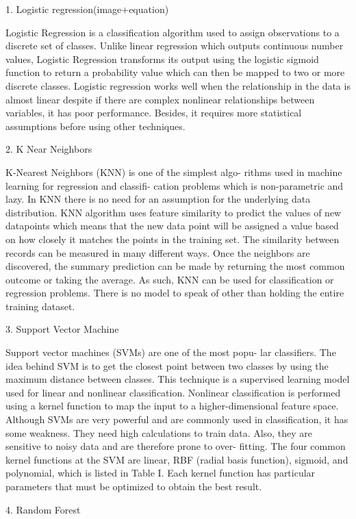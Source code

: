 \documentclass[final]{cvpr}
\begin{document}
1. Logistic regression(image+equation)


Logistic Regression is a classification algorithm used to
assign observations to a discrete set of classes. Unlike linear
regression which outputs continuous number values, Logistic
Regression transforms its output using the logistic sigmoid
function to return a probability value which can then be
mapped to two or more discrete classes. Logistic regression
works well when the relationship in the data is almost linear
despite if there are complex nonlinear relationships between
variables, it has poor performance. Besides, it requires more
statistical assumptions before using other techniques.

2. K Near Neighbors

K-Nearest Neighbors (KNN) is one of the simplest algo-
rithms used in machine learning for regression and classifi-
cation problems which is non-parametric and lazy. In KNN
there is no need for an assumption for the underlying data
distribution. KNN algorithm uses feature similarity to predict
the values of new datapoints which means that the new data
point will be assigned a value based on how closely it matches
the points in the training set. The similarity between records
can be measured in many different ways. Once the neighbors
are discovered, the summary prediction can be made by
returning the most common outcome or taking the average.
As such, KNN can be used for classification or regression
problems. There is no model to speak of other than holding
the entire training dataset.


3. Support Vector Machine

Support vector machines (SVMs) are one of the most popu-
lar classifiers. The idea behind SVM is to get the closest point
between two classes by using the maximum distance between
classes. This technique is a supervised learning model used
for linear and nonlinear classification. Nonlinear classification
is performed using a kernel function to map the input to a
higher-dimensional feature space. Although SVMs are very
powerful and are commonly used in classification, it has some
weakness. They need high calculations to train data. Also, they
are sensitive to noisy data and are therefore prone to over-
fitting. The four common kernel functions at the SVM are
linear, RBF (radial basis function), sigmoid, and polynomial,
which is listed in Table I. Each kernel function has particular
parameters that must be optimized to obtain the best result.

4.  Random Forest
\end{document}
